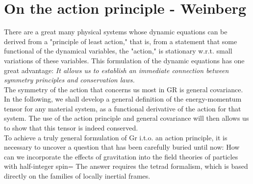 \newpage
\section{On the action principle - Weinberg}
There are a great many physical systems whose dynamic equations can be derived from a "principle of least action," that is, from a statement that some functional of the dynamical variables, the "action," is stationary w.r.t. small variations of these variables. This formulation of the dynamic equations has one great advantage: \emph{It allows us to establish an immediate connection between symmetry principles and conservation laws.}\\
The symmetry of the action that concerns us most in GR is general covariance. In the following, we shall develop a general definition of the energy-momentum tensor for any material system, as a functional derivative of the action for that system. The use of the action principle and general covariance will then allows us to show that this tensor is indeed conserved.\\
To achieve a truly general formulation of Gr i.t.o. an action principle, it is necessary to uncover a question that has been carefully buried until now: How can we incorporate the effects of gravitation into the field theories of particles with half-integer spin= The answer requires the tetrad formalism, which is based directly on the families of locally inertial frames.

